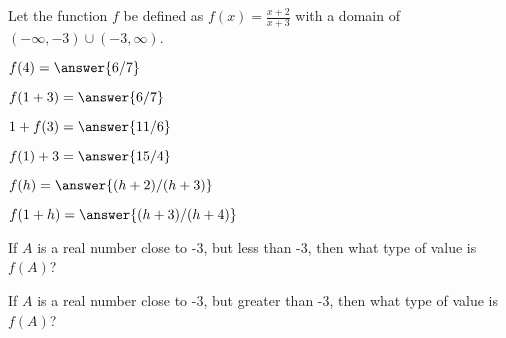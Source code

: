 \documentclass{ximera}
\begin{document}
\begin{definition}
Let the function $f$ be defined as $f(x) = \frac{x+2}{x+3}$ with a domain of $(-\infty, -3) \cup (-3, \infty)$. 

\end{definition}




\begin{exercise}
$f(4) = \answer{6/7} $ 
\end{exercise}




\begin{exercise}
$f(1+3) = \answer{6/7} $ 
\end{exercise}



\begin{exercise}
$1+ f(3) = \answer{11/6} $ 
\end{exercise}



\begin{exercise}
$f(1)+3 = \answer{15/4} $ 
\end{exercise}



\begin{exercise}
$f(h) = \answer{(h+2)/(h+3)} $ 
\end{exercise}


\begin{exercise}
$f(1+h) = \answer{(h+3)/(h+4)} $ 
\end{exercise}





\begin{exercise}
If $A$ is a real number close to -3, but less than -3, then what type of value is $f(A)$?

\begin{multipleChoice}
\end{multipleChoice}

\end{exercise}



\begin{exercise}
If $A$ is a real number close to -3, but greater than -3, then what type of value is $f(A)$?

\begin{multipleChoice}
\end{multipleChoice}

\end{exercise}
\end{document}
